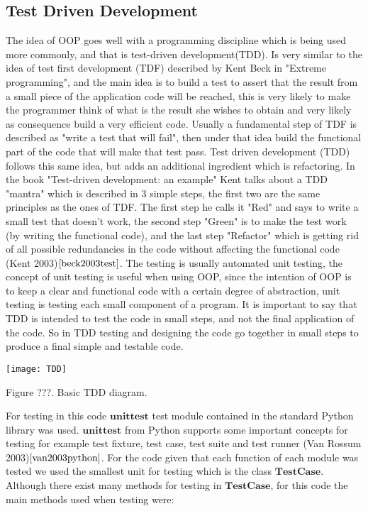 \documentclass{article}
\begin{document}
\subsection{Test Driven Development}
The idea of OOP goes well with a programming discipline which is being used more commonly, and that is test-driven development(TDD). Is very similar to the idea of test first development (TDF) described by Kent Beck in "Extreme programming", and the main idea is to build a test to assert that the result from a small piece of the application code will be reached, this is very likely to make the programmer think of what is the result she wishes to obtain and very likely as consequence build a very efficient code. Usually a fundamental  step of TDF is described as "write a test that will fail", then under that idea build the functional part of the code that will make that test pass. Test driven development (TDD) follows this same idea, but adds an additional ingredient which is refactoring. In the book "Test-driven development: an example" Kent talks about a TDD "mantra" which is described in 3 simple steps, the first two are the same principles as the ones of TDF. The first step he calls it "Red" and says to write a small test that doesn't work, the second step "Green" is to make the test work (by writing the functional code), and the last step "Refactor" which is getting rid of all possible redundancies in the code without affecting the functional code (Kent 2003)$\cite{beck2003test}$. The testing is usually automated unit testing, the concept of unit testing is useful when using OOP, since the intention of OOP is to keep a clear and functional code with a certain degree of abstraction, unit testing is testing each small component of a program. It is important to say that TDD is intended to test the code in small steps, and not the final application of the code. So in TDD testing and designing the code go together in small steps to produce a final simple and testable code. 

\begin{center}
	\texttt{[image: TDD]}

Figure ???. Basic TDD diagram.
\end{center}

For testing in this code $\textbf{unittest}$ test module contained in the standard Python library was used. $\textbf{unittest}$ from Python supports some important concepts for testing for example test fixture, test case, test suite and test runner (Van Rossum 2003)$\cite{van2003python}$. For the code given that each function of each module was tested we used the smallest unit for testing which is the class $\textbf{TestCase}$. Although there exist many methods for testing in $\textbf{TestCase}$,  for this code the main methods used when testing were:
\end{document}
